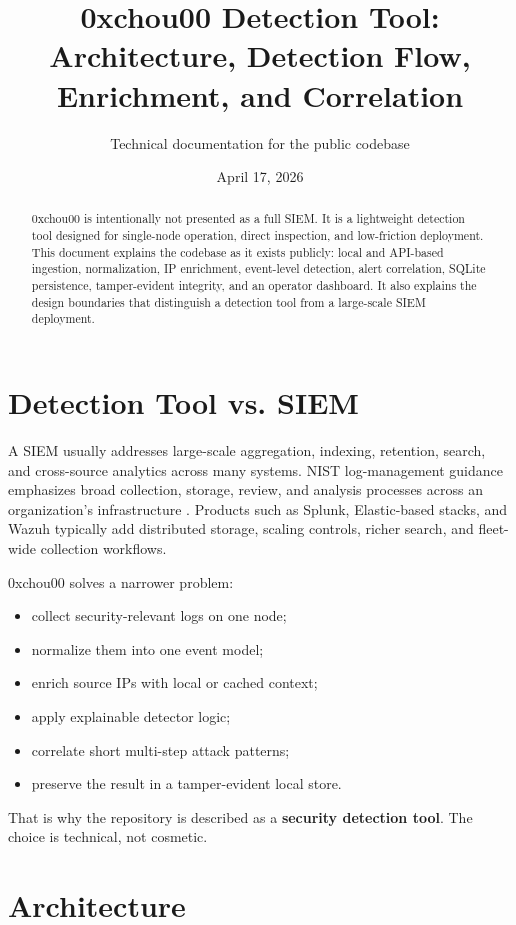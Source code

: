 \documentclass[11pt,a4paper]{article}
\title{0xchou00 Detection Tool:\\Architecture, Detection Flow, Enrichment, and Correlation}
\author{Technical documentation for the public codebase}
\date{April 17, 2026}
\begin{document}
\maketitle

\begin{abstract}
0xchou00 is intentionally not presented as a full SIEM. It is a lightweight detection tool designed for single-node operation, direct inspection, and low-friction deployment. This document explains the codebase as it exists publicly: local and API-based ingestion, normalization, IP enrichment, event-level detection, alert correlation, SQLite persistence, tamper-evident integrity, and an operator dashboard. It also explains the design boundaries that distinguish a detection tool from a large-scale SIEM deployment.
\end{abstract}

\section{Detection Tool vs. SIEM}

A SIEM usually addresses large-scale aggregation, indexing, retention, search, and cross-source analytics across many systems. NIST log-management guidance emphasizes broad collection, storage, review, and analysis processes across an organization's infrastructure \citep{nist80092}. Products such as Splunk, Elastic-based stacks, and Wazuh typically add distributed storage, scaling controls, richer search, and fleet-wide collection workflows.

0xchou00 solves a narrower problem:

\begin{itemize}[leftmargin=1.5em]
  \item collect security-relevant logs on one node;
  \item normalize them into one event model;
  \item enrich source IPs with local or cached context;
  \item apply explainable detector logic;
  \item correlate short multi-step attack patterns;
  \item preserve the result in a tamper-evident local store.
\end{itemize}

That is why the repository is described as a \textbf{security detection tool}. The choice is technical, not cosmetic.

\section{Architecture}
\end{document}
